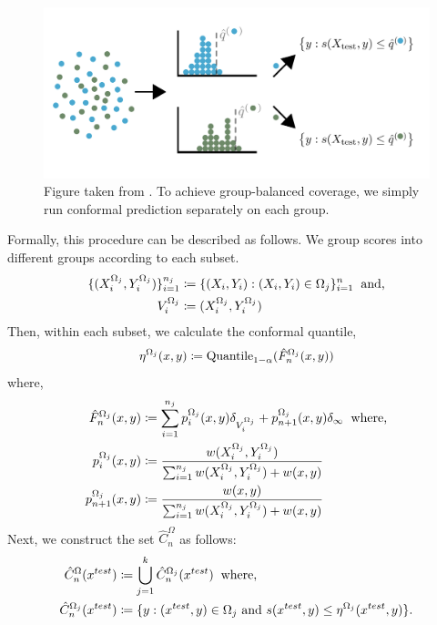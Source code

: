 \begin{figure}[!htp]
    \centering
    \includegraphics[height=0.25\textwidth]{figures/copp/grp.png}
    \caption{Figure taken from \cite{conf-bates}. To achieve group-balanced coverage, we simply run conformal prediction separately on each group.}
    \label{fig:grps}
\end{figure}
Formally, this procedure can be described as follows. We group scores into different groups according to each subset.
\begin{align}
    \{(X_i^{\Omega_j}, Y_i^{\Omega_j})\}_{i = 1}^{n_j} &\coloneqq \{(X_i, Y_i): (X_i, Y_i) \in \Omega_j\}_{i = 1}^{n} \hspace{0.2cm} \textup{and,} \nonumber \\
    V_i^{\Omega_j} &\coloneqq (X_i^{\Omega_j}, Y_i^{\Omega_j}) \nonumber
\end{align}
Then, within each subset, we calculate the conformal quantile, 
\begin{align}
    \eta^{\Omega_j}(x, y) \coloneqq \textup{Quantile}_{1-\alpha}( \hat{F}^{\Omega_j}_n(x, y)) \nonumber
\end{align}
where,
\begin{align}
    \hat{F}^{\Omega_j}_n(x, y) &\coloneqq \sum_{i=1}^{n_j} p_i^{\Omega_j} (x, y)\delta_{V_i^{\Omega_j}} + p_{n+1}^{\Omega_j}(x,y)\delta_\infty  \hspace{0.2cm} \textup{where,} \nonumber \\
    p_i^{\Omega_j} (x, y) &\coloneqq \frac{w(X^{\Omega_j}_i, Y^{\Omega_j}_i)}{\sum_{i=1}^{n_j} w(X^{\Omega_j}_i, Y^{\Omega_j}_i) + w(x,y)} \nonumber\\
    p_{n+1}^{\Omega_j} (x, y) &\coloneqq \frac{w(x,y)}{\sum_{i=1}^{n_j} w(X^{\Omega_j}_i, Y^{\Omega_j}_i) + w(x,y)} \nonumber
\end{align}
Next, we construct the set $\hat{C}_n^{\Omega}$ as follows:
\begin{align}
    \hat{C}_n^{\Omega}(x^{test}) &\coloneqq \bigcup_{j=1}^k \hat{C}_n^{\Omega_j}(x^{test}) \hspace{0.2cm} \textup{where,} \nonumber \\
    \hat{C}_n^{\Omega_j}(x^{test}) &\coloneqq \{y:  (x^{test}, y) \in \Omega_j \textup{ and } s(x^{test},y) \leq \eta^{\Omega_j}(x^{test}, y)  \}. \nonumber \\
\end{align}

